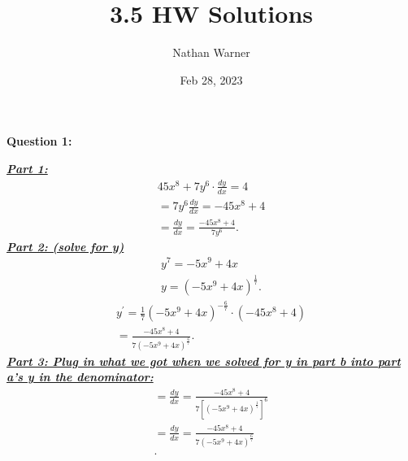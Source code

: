 \documentclass{report}
\title{\Huge{3.5 HW Solutions}}
\author{\huge{Nathan Warner}}
\date{\huge{Feb 28, 2023}}
\begin{document}
    \maketitle
    \begin{Large}
        \noindent \textbf{Question 1:}
    \end{Large}
    \bigbreak \noindent 
    \bigbreak \noindent 
    \textbf{\textit{\underline{Part 1:}}}
    \begin{align*}
        45x^{8}+7y^{6}\cdot \frac{dy}{dx}=4 \\
        = 7y^{6}\frac{dy}{dx} = -45x^{8} +4 \\
        = \frac{dy}{dx} = \frac{-45x^{8}+4}{7y^{6}}
    .\end{align*}
    \bigbreak \noindent 
    \textbf{\textit{\underline{Part 2: (solve for y)}}}
    \begin{align*}
        y^{7} = -5x^{9}+4x  \\
        y = (-5x^{9}+4x)^{\frac{1}{7}}
    .\end{align*}
    \begin{align*}
        y^{\prime} = \frac{1}{7}(-5x^{9}+4x)^{-\frac{6}{7}} \cdot (-45x^{8}+4) \\ 
        = \frac{-45x^{8}+4}{7(-5x^{9}+4x)^{\frac{6}{7}}}
    .\end{align*}
    \textbf{\textit{\underline{Part 3: Plug in what we got when we solved for y in part b into part a's y in the denominator:}}}
    \begin{align*}
        = \frac{dy}{dx} = \frac{-45x^{8}+4}{7[(-5x^{9}+4x)^{\frac{1}{7}}]^{6}}\\
        = \frac{dy}{dx} = \frac{-45x^{8}+4}{7(-5x^{9}+4x)^{\frac{6}{7}}}\\
    .\end{align*}
\end{document}
